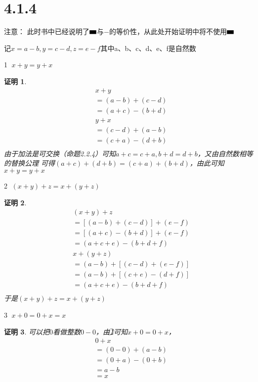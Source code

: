 \documentclass{article}
\theoremstyle{mystyle}
\theoremstyle{zproofstyle}
\newtheorem*{zproof}{证明}
\newcommand{\zsub}{\mathbin{\rule{1em}{0.5em}}}
\begin{document}
\section*{4.1.4}
注意： 此时书中已经说明了$\zsub$与$-$的等价性，从此处开始证明中将不使用$\zsub$

记$x = a - b, y = c - d, z = e - f$其中a、b、c、d、e、f是自然数

\textcircled{1} $x + y = y + x$

\begin{zproof}
  \begin{align*}
     & x + y           \\
     & = (a-b)+(c-d)   \\
     & = (a+c) - (b+d) \\
     & y + x           \\
     & =(c-d)+(a-b)    \\
     & =(c+a) - (d+b)  \\
  \end{align*}
  由于加法是可交换（命题2.2.4）可知$a+c=c+a,b+d=d+b$，又由自然数相等的替换公理
  可得$(a+c) + (d+b) = (c+a) + (b+d)$，由此可知$x + y = y + x$
\end{zproof}

\textcircled{2} $(x+y)+z=x+(y+z)$

\begin{zproof}
  \begin{align*}
     & (x+y)+z               \\
     & = [(a-b)+(c-d)]+(e-f) \\
     & = [(a+c)-(b+d)]+(e-f) \\
     & = (a+c+e) - (b+d+f)   \\
     & x+(y+z)               \\
     & = (a-b)+[(c-d)+(e-f)] \\
     & = (a-b)+[(c+e)-(d+f)] \\
     & = (a+c+e) - (b+d+f)   \\
  \end{align*}
  于是$(x+y)+z=x+(y+z)$

\end{zproof}

\textcircled{3} $x+0=0+x=x$

\begin{zproof}
  可以把$0$看做整数$0-0$，由\textcircled{1}可知$x+0=0+x$，
  \begin{align*}
     & 0+x           \\
     & = (0-0)+(a-b) \\
     & = (0+a)-(0+b) \\
     & = a-b         \\
     & = x
  \end{align*}
\end{zproof}
\end{document}
